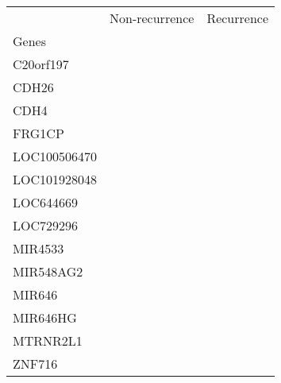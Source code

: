 \begin{tabular}{lcc}
\toprule
{} & Non-recurrence & Recurrence \\
Genes        &                &            \\
\midrule
C20orf197    &                &            \\
CDH26        &                &            \\
CDH4         &                &            \\
FRG1CP       &                &            \\
LOC100506470 &                &            \\
LOC101928048 &                &            \\
LOC644669    &                &            \\
LOC729296    &                &            \\
MIR4533      &                &            \\
MIR548AG2    &                &            \\
MIR646       &                &            \\
MIR646HG     &                &            \\
MTRNR2L1     &                &            \\
ZNF716       &                &            \\
\bottomrule
\end{tabular}
